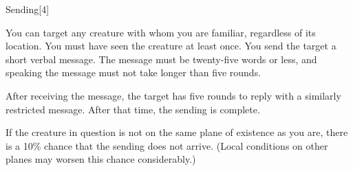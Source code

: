 \begin{spellsection}{Sending}[4]
    \begin{spellheader}
    \end{spellheader}
    \begin{spellcontent}
        \begin{spelltargetinginfo}
        \end{spelltargetinginfo}
        \begin{spelleffects}

            \spellspecial You can target any creature with whom you are familiar, regardless of its location. You must have seen the creature at least once.
            \spelleffect You send the target a short verbal message. The message must be twenty-five words or less, and speaking the message must not take longer than five rounds.

            After receiving the message, the target has five rounds to reply with a similarly restricted message. After that time, the sending is complete.
        \end{spelleffects}
    \end{spellcontent}
    \begin{spellfooter}
        \spellnotes If the creature in question is not on the same plane of existence as you are, there is a 10\% chance that the sending does not arrive. (Local conditions on other planes may worsen this chance considerably.)
    \end{spellfooter}
\end{spellsection}

